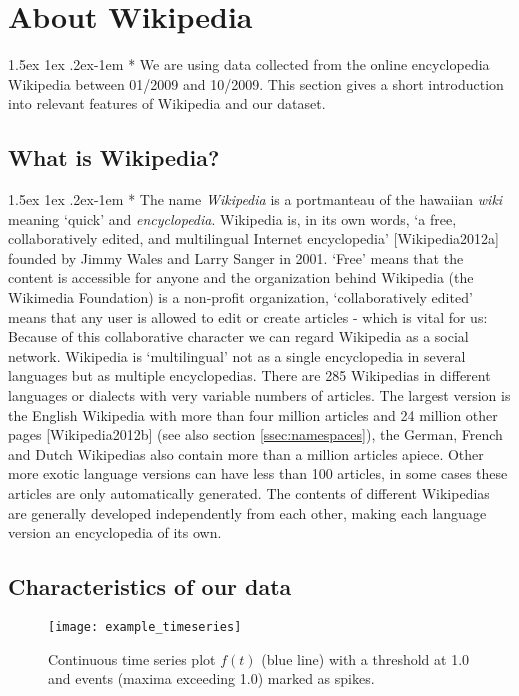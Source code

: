 \documentclass[a4paper,12pt,twoside]{article}
\makeatletter
\renewcommand{\paragraph}{%
  \@startsection{paragraph}{4}%
  {\z@}{1.5ex \@plus 1ex \@minus .2ex}{-1em}%
  {\normalfont\normalsize\bfseries}%
}
\makeatother
\begin{document}
\section{About Wikipedia}
\paragraph*{} We are using data collected from the online encyclopedia Wikipedia between 01/2009 and 10/2009. This section gives a short introduction into relevant features of Wikipedia and our dataset.\vspace{-6pt}
\subsection{What is Wikipedia?}
\paragraph*{} The name \emph{Wikipedia} is a portmanteau of the hawaiian \emph{wiki} meaning `quick' and \emph{encyclopedia}. Wikipedia is, in its own words, `a free, collaboratively edited, and multilingual Internet encyclopedia' [{\sc Wikipedia}2012a] founded by Jimmy Wales and Larry Sanger in 2001. `Free' means that the content is accessible for anyone and the organization behind Wikipedia (the Wikimedia Foundation) is a non-profit organization, `collaboratively edited' means that any user is allowed to edit or create articles - which is vital for us: Because of this collaborative character we can regard Wikipedia as a social network. Wikipedia is `multilingual' not as a single encyclopedia in several languages but as multiple encyclopedias. There are 285 Wikipedias in different languages or dialects with very variable numbers of articles. The largest version is the English Wikipedia with more than four million articles and 24 million other pages [{\sc Wikipedia}2012b] (see also section \ref{ssec:namespaces}), the German, French and Dutch Wikipedias also contain more than a million articles apiece. Other more exotic language versions can have less than 100 articles, in some cases these articles are only automatically generated. The contents of different Wikipedias are generally developed independently from each other, making each language version an encyclopedia of its own.\vspace{-6pt}
\subsection{Characteristics of our data}
\label{ssec:data}
\vspace{-12pt}
\begin{figure}[!htb]
\centering
\texttt{[image: example\_timeseries]}
\vspace{-3mm}
\caption{Continuous time series plot $f(t)$ (blue line) with a threshold at 1.0 and events (maxima exceeding 1.0) marked as spikes.}
\label{img:example_timeseries}
\vspace{-6mm}
\end{figure}
\end{document}

